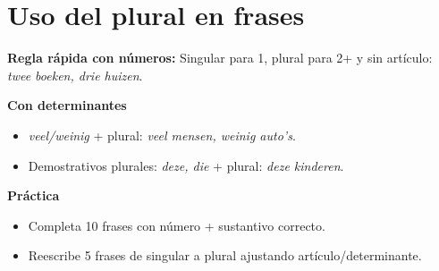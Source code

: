 \section{Uso del plural en frases}
\textbf{Regla rápida con números:} Singular para 1, plural para 2+ y sin artículo: \textit{twee boeken, drie huizen}.

\textbf{Con determinantes}
\begin{itemize}[leftmargin=*]
  \item \textit{veel/weinig} + plural: \textit{veel mensen, weinig auto's}.
  \item Demostrativos plurales: \textit{deze, die} + plural: \textit{deze kinderen}.
\end{itemize}

\textbf{Práctica}
\begin{itemize}[leftmargin=*]
  \item Completa 10 frases con número + sustantivo correcto.
  \item Reescribe 5 frases de singular a plural ajustando artículo/determinante.
\end{itemize}
